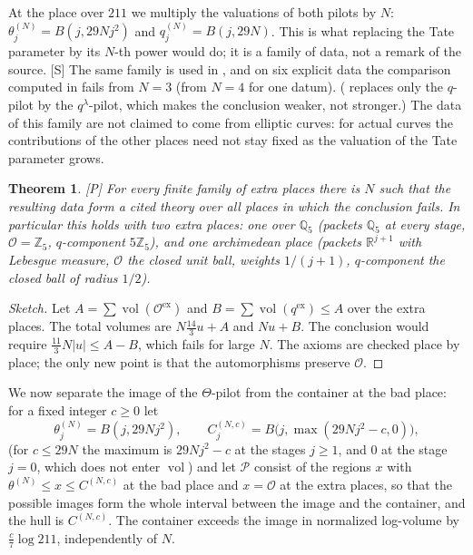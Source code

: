 \documentclass[11pt]{article}
\theoremstyle{plain}
\newtheorem{theorem}{Theorem}
\theoremstyle{definition}
\theoremstyle{remark}
\newcommand{\Smark}{\textup{[S]}}
\newcommand{\Pmark}{\textup{[P]}}
\newcommand{\vol}{\operatorname{vol}}
\newcommand{\Poss}{\mathcal P}
\newcommand{\cO}{\mathcal O}
\newcommand{\Qp}[1]{\mathbb Q_{#1}}
\begin{document}
At the place over $211$ we multiply the valuations of both pilots by $N$:
$\theta^{(N)}_j=B(j,29Nj^2)$ and $q^{(N)}_j=B(j,29N)$. This is what replacing the Tate
parameter by its $N$-th power would do; it is a family of data, not a remark of the
source. \Smark{} The same family is used in \cite[Theorem~3.6]{RF}, and on six explicit
data the comparison computed in \cite[\S10]{TC} fails from $N=3$ (from $N=4$ for one
datum).
(\cite[Rem.~3.11.1(ii)]{IUT3} replaces only the $q$-pilot by the $q^\lambda$-pilot, which
makes the conclusion weaker, not stronger.) The data of this family are not claimed to come
from elliptic curves: for actual curves the contributions of the other places need not stay
fixed as the valuation of the Tate parameter grows.

\begin{theorem}\label{t:robust}
\Pmark{} For every finite family of extra places there is $N$ such that the resulting
data form a cited theory over all places in which the conclusion fails. In particular this holds with two extra places: one over $\Qp5$ (packets $\Qp5$ at
every stage, $\cO=\mathbb Z_5$, $q$-component $5\mathbb Z_5$), and one archimedean place
(packets $\mathbb R^{j+1}$ with Lebesgue measure, $\cO$ the closed unit ball, weights
$1/(j+1)$, $q$-component the closed ball of radius $1/2$).
\end{theorem}

\begin{proof}[Sketch]
Let $A=\sum\vol(\cO^{\mathrm{ex}})$ and $B=\sum\vol(q^{\mathrm{ex}})\le A$ over the extra
places. The total volumes are $N\frac{14}3u+A$ and $Nu+B$. The conclusion would require
$\frac{11}3N|u|\le A-B$, which fails for large $N$. The axioms are checked place by
place; the only new point is that the automorphisms preserve $\cO$.
\end{proof}

We now separate the image of the $\Theta$-pilot from the container at the bad place: for
a fixed integer $c\ge0$ let
\[
\theta^{(N)}_j=B(j,29Nj^2),\qquad C^{(N,c)}_j=B\bigl(j,\max(29Nj^2-c,0)\bigr),
\]
(for $c\le29N$ the maximum is $29Nj^2-c$ at the stages $j\ge1$, and $0$ at the stage
$j=0$, which does not enter $\vol$)
and let $\Poss$ consist of the regions $x$ with $\theta^{(N)}\le x\le C^{(N,c)}$ at the bad
place and $x=\cO$ at the extra places, so that the possible images form the whole interval
between the image and the container, and the hull is $C^{(N,c)}$. The container exceeds
the image in normalized log-volume by $\frac c7\log211$, independently of $N$.
\end{document}
